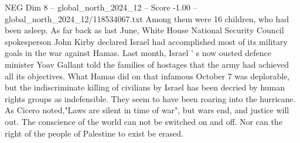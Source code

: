\begin{textsample}{NEG Dim 8 – global\_north\_2024\_12 – Score -1.00 – global\_north\_2024\_12/118534067.txt}
Among them were 16 children, who had been asleep.
As far back as last June, White House National Security Council spokesperson John Kirby declared Israel had accomplished most of its military goals in the war against Hamas.
Last month, Israel ' s now ousted defence minister Yoav Gallant told the families of hostages that the army had achieved all its objectives.
What Hamas did on that infamous October 7 was deplorable, but the indiscriminate killing of civilians by Israel has been decried by human rights groups as indefensible.
They seem to have been roaring into the hurricane.
As Cicero noted,"Laws are silent in time of war", but wars end, and justice will out.
The conscience of the world can not be switched on and off.
Nor can the right of the people of Palestine to exist be erased.

\end{textsample}
